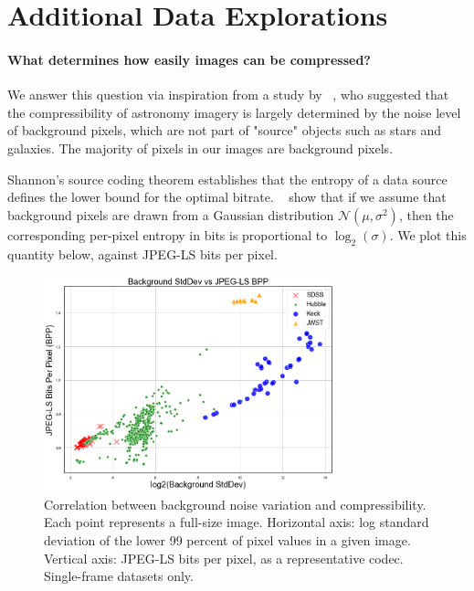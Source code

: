 \section{Additional Data Explorations}\label{sec:additional-data-explorations}

\paragraph{What determines how easily images can be compressed?}

We answer this question via inspiration from a study by ~\citealt{pence2009lossless}, who suggested that the compressibility of astronomy imagery is largely determined by the noise level of background pixels, which are not part of "source" objects such as stars and galaxies. The majority of pixels in our images are background pixels. 

Shannon’s source coding theorem establishes that the entropy of a data source defines the lower bound for the optimal bitrate. ~\citealt{pence2009lossless} show that if we assume that background pixels are drawn from a Gaussian distribution $\mathcal{N}(\mu, \sigma^2)$, then the corresponding per-pixel entropy in bits is proportional to $\log_2(\sigma)$.  We plot this quantity below, against JPEG-LS bits per pixel.

\begin{figure}[h]
  \centering
  \includegraphics[width=0.75\textwidth]{figs/bkg_vs_jpg.png}
  \caption{Correlation between background noise variation and compressibility. Each point represents a full-size image. Horizontal axis: log standard deviation of the lower 99 percent of pixel values in a given image. Vertical axis: JPEG-LS bits per pixel, as a representative codec. Single-frame datasets only.}
  \label{fig:bkg}
  \vspace{-1em}
\end{figure}


